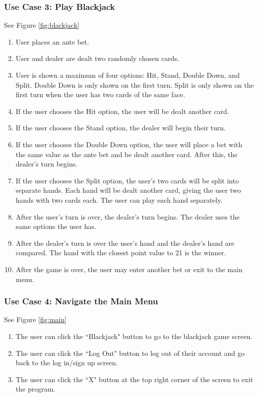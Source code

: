 \documentclass[10pt,conference,onecolumn,compsoc]{IEEEtran}
\begin{document}
\subsubsection{Use Case 3: Play Blackjack}
See Figure \ref{fig:blackjack}
\begin{enumerate}
\item User places an ante bet.
\item User and dealer are dealt two randomly chosen cards. 
\item User is shown a maximum of four options: Hit, Stand, Double Down, and Split. Double Down is only shown on the first turn. Split is only shown on the first turn when the user has two cards of the same face.
\item If the user chooses the Hit option, the user will be dealt another card.
\item If the user chooses the Stand option, the dealer will begin their turn.
\item If the user chooses the Double Down option, the user will place a bet with the same value as the ante bet and be dealt another card. After this, the dealer's turn begins.
\item If the user chooses the Split option, the user's two cards will be split into separate hands. Each hand will be dealt another card, giving the user two hands with two cards each. The user can play each hand separately.
\item After the user's turn is over, the dealer's turn begins. The dealer uses the same options the user has.
\item After the dealer's turn is over the user's hand and the dealer's hand are compared. The hand with the closest point value to 21 is the winner.
\item After the game is over, the user may enter another bet or exit to the main menu.
\end{enumerate}


\subsubsection{Use Case 4: Navigate the Main Menu}
See Figure \ref{fig:main}
\begin{enumerate}
\item The user can click the ``Blackjack" button to go to the blackjack game screen.
\item The user can click the ``Log Out" button to log out of their account and go back to the log in/sign up screen.
\item The user can click the ``X" button at the top right corner of the screen to exit the program.
\end{enumerate}
\end{document}
